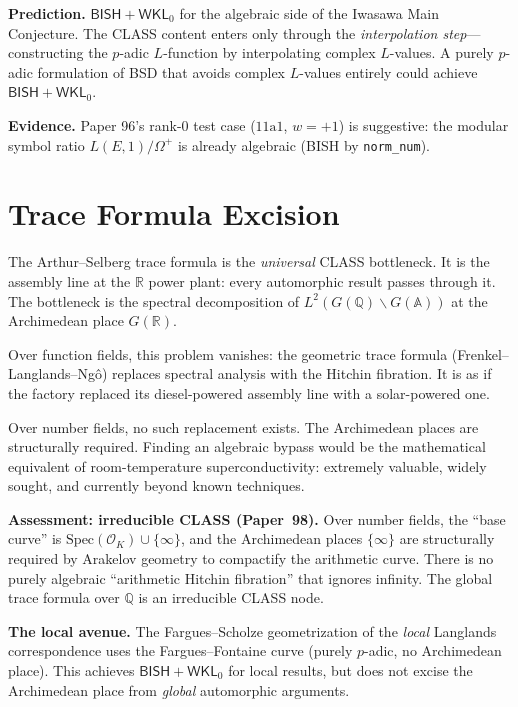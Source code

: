 \documentclass[11pt,twoside,openany]{report}
\theoremstyle{remark}
\newcommand{\BISH}{\textsf{BISH}}
\newcommand{\CLASS}{\textsf{CLASS}}
\newcommand{\paperref}[1]{\textbf{Paper~#1}}
\begin{document}
\textbf{Prediction.} $\BISH + \textsf{WKL}_0$ for the algebraic side of the Iwasawa Main Conjecture. The \CLASS{} content enters only through the \emph{interpolation step}---constructing the $p$-adic $L$-function by interpolating complex $L$-values. A purely $p$-adic formulation of BSD that avoids complex $L$-values entirely could achieve $\BISH + \textsf{WKL}_0$.

\textbf{Evidence.} Paper 96's rank-0 test case ($11\mathrm{a}1$, $w = +1$) is suggestive: the modular symbol ratio $L(E,1)/\Omega^+$ is already algebraic (\BISH{} by \texttt{norm\_num}).


\section{Trace Formula Excision}

\begin{analogybox}
The Arthur--Selberg trace formula is the \emph{universal} \CLASS{} bottleneck. It is the assembly line at the $\mathbb{R}$ power plant: every automorphic result passes through it. The bottleneck is the spectral decomposition of $L^2(G(\mathbb{Q}) \backslash G(\mathbb{A}))$ at the Archimedean place $G(\mathbb{R})$.

Over function fields, this problem vanishes: the geometric trace formula (Frenkel--Langlands--Ng\^o) replaces spectral analysis with the Hitchin fibration. It is as if the factory replaced its diesel-powered assembly line with a solar-powered one.

Over number fields, no such replacement exists. The Archimedean places are structurally required. Finding an algebraic bypass would be the mathematical equivalent of room-temperature superconductivity: extremely valuable, widely sought, and currently beyond known techniques.
\end{analogybox}

\textbf{Assessment: irreducible \CLASS{} (\paperref{98}).} Over number fields, the ``base curve'' is $\mathrm{Spec}(\mathcal{O}_K) \cup \{\infty\}$, and the Archimedean places $\{\infty\}$ are structurally required by Arakelov geometry to compactify the arithmetic curve. There is no purely algebraic ``arithmetic Hitchin fibration'' that ignores infinity. The global trace formula over $\mathbb{Q}$ is an irreducible \CLASS{} node.

\textbf{The local avenue.} The Fargues--Scholze geometrization of the \emph{local} Langlands correspondence uses the Fargues--Fontaine curve (purely $p$-adic, no Archimedean place). This achieves $\BISH + \textsf{WKL}_0$ for local results, but does not excise the Archimedean place from \emph{global} automorphic arguments.
\end{document}

